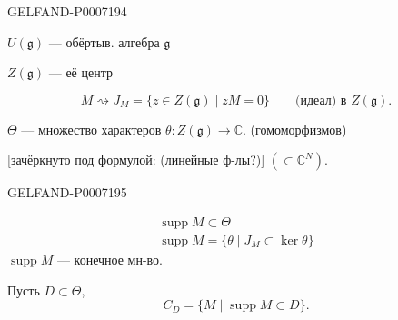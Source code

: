 \begin{GelfandAdjacentEvidence}{GELFAND-P000719}{4}


\(U(\mathfrak g)\) --- обёртыв. алгебра \(\mathfrak g\)

\(Z(\mathfrak g)\) --- её центр

\[
M\rightsquigarrow J_M=\{z\in Z(\mathfrak g)\mid zM=0\}
\qquad\text{(идеал) в }Z(\mathfrak g).
\]

\(\Theta\) --- множество характеров \(\theta:Z(\mathfrak g)\to\mathbb C\).
(гомоморфизмов)

[зачёркнуто под формулой: (линейные ф-лы?)] \((\subset\mathbb C^N)\).
\end{GelfandAdjacentEvidence}
\begin{GelfandAdjacentEvidence}{GELFAND-P000719}{5}

\end{GelfandAdjacentEvidence}


\begin{gather*}
\operatorname{supp}M\subset\Theta\\
\operatorname{supp}M=\{\theta\mid J_M\subset\ker\theta\}
\end{gather*}
\(\operatorname{supp}M\) --- конечное мн-во.

Пусть \(D\subset\Theta\),
\[
C_D=\{M\mid\operatorname{supp}M\subset D\}.
\]


